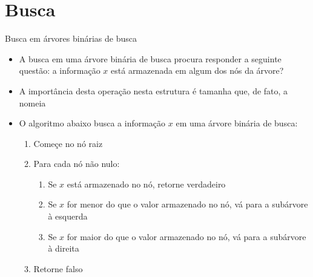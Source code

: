 \section{Busca}

\begin{frame}{Busca em árvores binárias de busca}

	\begin{itemize}

        \item A busca em uma árvore binária de busca procura responder a seguinte questão:
            a informação $x$ está armazenada em algum dos nós da árvore?

        \item A importância desta operação nesta estrutura é tamanha que, de fato, a nomeia

        \item O algoritmo abaixo busca a informação $x$ em uma árvore binária de busca:

        \begin{enumerate}
            \item Começe no nó {raiz}

            \item Para cada nó {não nulo}:

            \begin{enumerate}
                \item Se $x$ {está} armazenado no nó, {retorne verdadeiro}

                \item Se $x$ for {menor} do que o valor 
                armazenado no nó, vá para a subárvore à {esquerda}

                \item Se $x$ for {maior} do que o valor 
                armazenado no nó, vá para a subárvore à {direita}
            \end{enumerate}

            \item Retorne falso
        \end{enumerate}

	\end{itemize}

\end{frame}

